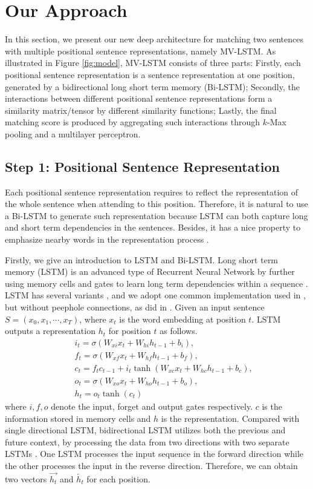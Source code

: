 \documentclass[letterpaper]{article}
\begin{document}
\section{Our Approach}
In this section, we present our new deep architecture for matching two sentences with multiple positional sentence representations, namely MV-LSTM.
As illustrated in Figure \ref{fig:model}, MV-LSTM consists of three parts: Firstly, each positional sentence representation is a sentence representation at one position, generated by a bidirectional long short term memory (Bi-LSTM); Secondly, the interactions between different positional sentence representations form a similarity matrix/tensor by different similarity functions; Lastly, the final matching score is produced by aggregating such interactions through $k$-Max pooling and a multilayer perceptron.
\subsection{Step 1: Positional Sentence Representation}
Each positional sentence representation requires to reflect the representation of the whole sentence when attending to this position.
Therefore, it is natural to use a Bi-LSTM to generate such representation because LSTM can both capture long and short term dependencies in the sentences. Besides, it has a nice property to emphasize nearby words in the representation process \cite{bahdanau2014neural}.

Firstly, we give an introduction to LSTM and Bi-LSTM.
Long short term memory (LSTM) is an advanced type of Recurrent Neural Network by further using memory cells and gates to learn long term dependencies within a sequence \cite{Hochreiter:1997:LSM:1246443.1246450}. LSTM has several variants \cite{2015arXiv150304069G}, and we adopt one common implementation used in \cite{graves2013speech}, but without peephole connections, as did in \cite{palangi2015deep}. Given an input sentence $S=(x_0,x_1,\cdots,x_T)$, where $x_t$ is the word embedding at position $t$. LSTM outputs a representation $h_t$ for position $t$ as follows.
\begin{eqnarray*}
 &&i_t=\sigma(W_{xi}x_t+W_{hi}h_{t-1}+b_{i}),\\
 &&f_t=\sigma(W_{xf}x_t+W_{hf}h_{t-1}+b_{f}),\\
  &&c_t=f_tc_{t-1}+i_t\tanh(W_{xc}x_t+W_{hc}h_{t-1}+b_{c}),\\
   &&o_t=\sigma(W_{xo}x_t+W_{ho}h_{t-1}+b_{o}),\\
   &&h_t=o_t\tanh(c_t)
\end{eqnarray*}
where $i, f, o$ denote the input, forget and output gates respectively. $c$ is the information stored in memory cells and $h$ is the representation.
Compared with single directional LSTM, bidirectional LSTM utilizes both the previous and future context, by processing the data from two directions with two separate LSTMs \cite{Schuster:1997:BRN:2198065.2205129}. One LSTM processes the input sequence in the forward direction while the other processes the input in the reverse direction. Therefore, we can obtain two vectors $\overrightarrow{h_t}$ and $\overleftarrow{h_t}$ for each position.
\end{document}
